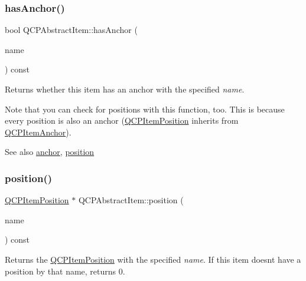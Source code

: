 \mbox{\label{class_q_c_p_abstract_item_a84914f4516f9b38ef0bd89eafe3dbda7}} 
\subsubsection{\texorpdfstring{has\+Anchor()}{hasAnchor()}}
{\footnotesize\ttfamily bool Q\+C\+P\+Abstract\+Item\+::has\+Anchor (\begin{DoxyParamCaption}\item[{const Q\+String \&}]{name }\end{DoxyParamCaption}) const}

Returns whether this item has an anchor with the specified {\itshape name}.

Note that you can check for positions with this function, too. This is because every position is also an anchor (\hyperlink{class_q_c_p_item_position}{Q\+C\+P\+Item\+Position} inherits from \hyperlink{class_q_c_p_item_anchor}{Q\+C\+P\+Item\+Anchor}).

\begin{DoxySeeAlso}{See also}
\hyperlink{class_q_c_p_abstract_item_a139c255ea8831642fac91748e29a5adb}{anchor}, \hyperlink{class_q_c_p_abstract_item_a2589c3d298f9a576d77d9addb440a18d}{position} 
\end{DoxySeeAlso}
\mbox{\label{class_q_c_p_abstract_item_a2589c3d298f9a576d77d9addb440a18d}} 
\subsubsection{\texorpdfstring{position()}{position()}}
{\footnotesize\ttfamily \hyperlink{class_q_c_p_item_position}{Q\+C\+P\+Item\+Position} $\ast$ Q\+C\+P\+Abstract\+Item\+::position (\begin{DoxyParamCaption}\item[{const Q\+String \&}]{name }\end{DoxyParamCaption}) const}

Returns the \hyperlink{class_q_c_p_item_position}{Q\+C\+P\+Item\+Position} with the specified {\itshape name}. If this item doesn\textquotesingle{}t have a position by that name, returns 0.

